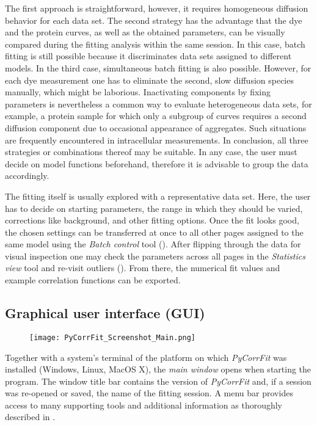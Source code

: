 The first approach is straightforward, however, it requires homogeneous diffusion behavior for each data set. The second strategy has the advantage that the dye and the protein curves, as well as the obtained parameters, can be visually compared during the fitting analysis within the same session. In this case, batch fitting is still possible because it discriminates data sets assigned to different models. In the third case, simultaneous batch fitting is also possible. However, for each dye measurement one has to eliminate the second, slow diffusion species manually, which might be laborious. Inactivating components by fixing parameters is nevertheless a common way to evaluate heterogeneous data sets, for example, a protein sample for which only a subgroup of curves requires a second diffusion component due to occasional appearance of aggregates. Such situations are frequently encountered in intracellular measurements. In conclusion, all three strategies or combinations thereof may be suitable. In any case, the user must decide on model functions beforehand, therefore it is advisable to group the data accordingly.

The fitting itself is usually explored with a representative data set. Here, the user has to decide on starting parameters, the range in which they should be varied, corrections like background, and other fitting options. Once the fit looks good, the chosen settings can be transferred at once to all other pages assigned to the same model using the \textit{Batch control} tool (). After flipping through the data for visual inspection one may check the parameters across all pages in the \textit{Statistics view} tool and re-visit outliers (). From there, the numerical fit values and example correlation functions can be exported.

\subsection{Graphical user interface (GUI)}
\label{sec:intro.graph}
\begin{figure}[h]
\centering
\texttt{[image: PyCorrFit\_Screenshot\_Main.png]}
\end{figure}
Together with a system's terminal of the platform on which \textit{PyCorrFit} was installed (Windows, Linux, MacOS X), the \textit{main window} opens when starting the program. The window title bar contains the version of \textit{PyCorrFit} and, if a session was re-opened or saved, the name of the fitting session. A menu bar provides access to many supporting tools and additional information as thoroughly described in . 

